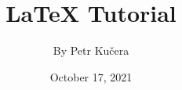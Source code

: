 \documentclass[a4paper,12pt]{book}
\begin{document}
\title{\Large{\textbf{LaTeX Tutorial}}}
\author{By Petr Kučera}
\date{October 17, 2021}

\maketitle

\blindtext[5]
\end{document}
